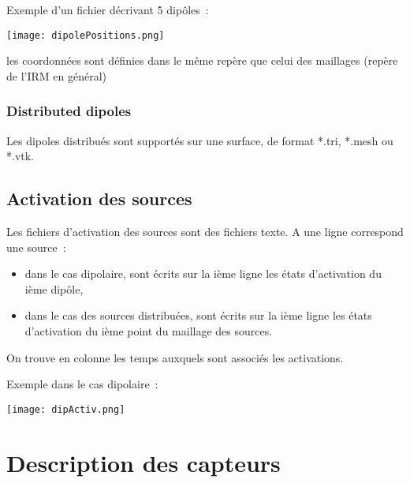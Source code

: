 \medskip

\noindent
Exemple d'un fichier décrivant 5 dipôles~:

\centerline{\texttt{[image: dipolePositions.png]}}

\begin{note}
    les coordonnées sont définies dans le même repère que celui des maillages (repère de l'IRM en général)
\end{note}

\subsubsection{Distributed dipoles}
Les dipoles distribués sont supportés sur une surface, de format *.tri, *.mesh ou *.vtk. 
\subsection{Activation des sources}
\label{sec:activ}

\noindent
Les fichiers d'activation des sources sont des fichiers texte. A une ligne correspond une source~: 
\begin{itemize}
    \item dans le cas dipolaire, sont écrits sur la ième ligne les états d'activation du ième dipôle,
    \item dans le cas des sources distribuées, sont écrits sur la ième ligne les états d'activation du ième point du maillage
          des sources.
\end{itemize}

\medskip

\noindent
On trouve en colonne les temps auxquels sont associés les activations.

\medskip

\noindent
Exemple dans le cas dipolaire~:

\centerline{\texttt{[image: dipActiv.png]}}


\section{Description des capteurs}
\label{sec:sensors}

